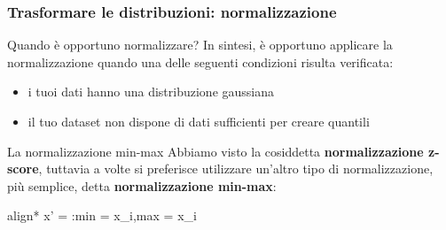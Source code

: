 \begin{frame}
	
	\frametitle{{\color{GradientDescentDiagramOrange}Trasformare le distribuzioni}: {\color{GradientDescentDiagramBlue}normalizzazione}}
	
	\begin{block}{Quando è opportuno normalizzare?}
		In sintesi, è opportuno applicare la normalizzazione quando una delle seguenti condizioni risulta verificata:
		\begin{itemize}
			\item i tuoi dati hanno una distribuzione gaussiana
			\item il tuo dataset non dispone di dati sufficienti per creare quantili
		\end{itemize}
	\end{block}
	
	\begin{block}{La normalizzazione min-max}
		Abbiamo visto la cosiddetta \textbf{normalizzazione z-score}, tuttavia a volte si preferisce utilizzare un'altro tipo di normalizzazione, più semplice, detta \textbf{normalizzazione min-max}:
		\begin{empheq}[box=\fcolorbox{blue!40!black!60}{yellow!10}]{align*}
		x' =  \quad:\quad min = \text{ }x_i,\text{ }max = \text{ }x_i
		\end{empheq}
	\end{block}
	
\end{frame}

